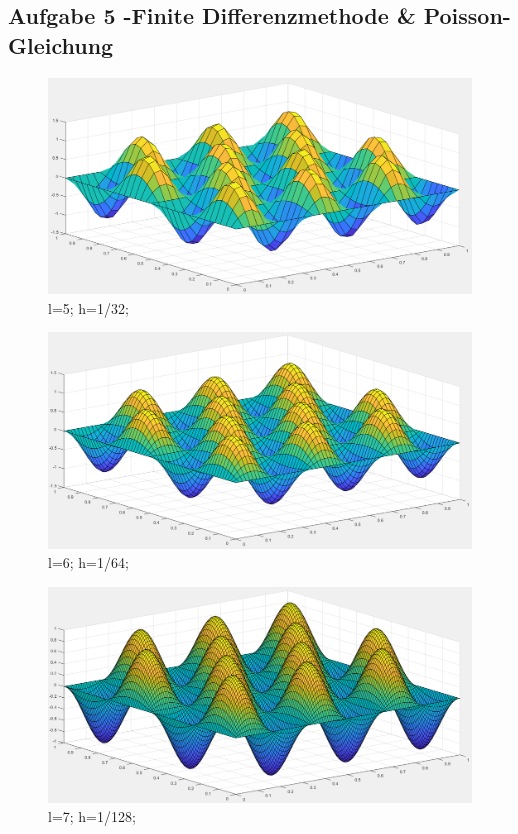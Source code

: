 \documentclass{report}
\begin{document}
    \subsection{Aufgabe 5 -Finite Differenzmethode \& Poisson-Gleichung}
	\begin{figure}
		\includegraphics[width=\linewidth]{Aufgaben-Ressourcen/A5L5M3N2.png} 
		\caption{l=5; h=1/32;}
		\label{A5L5}
	\end{figure}
	\begin{figure}
		\includegraphics[width=\linewidth]{Aufgaben-Ressourcen/A5L6M3N2.png} 
		\caption{l=6; h=1/64;}
		\label{A5L6}
	\end{figure}
	\begin{figure}
		\includegraphics[width=\linewidth]{Aufgaben-Ressourcen/A5L7M3N2.png}
		\caption{l=7; h=1/128;}
		\label{A5L7}
	\end{figure}
\end{document}
